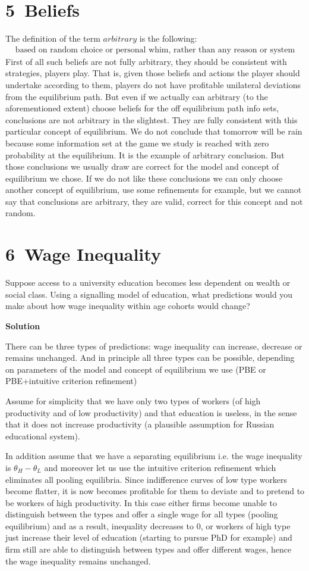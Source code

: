 \documentclass[a4paper]{article}
\begin{document}
\section*{5\ Beliefs}
The definition of the term $arbitrary$ is the following:
\begin{align*}
\text{based on random choice or personal whim, rather than any reason or system}
\end{align*}First of all such beliefs are not fully arbitrary, they should be consistent with strategies, players play. That is, given those beliefs and actions the player should undertake according to them, players do not have profitable unilateral deviations from the equilibrium path. But even if we actually can arbitrary (to the aforementioned extent) choose beliefs for the off equilibrium path info sets, conclusions are not arbitrary in the slightest. They are fully consistent with this particular concept of equilibrium. We do not conclude that tomorrow will be rain because some information set at the game we study is reached with zero probability at the equilibrium. It is the example of arbitrary conclusion. But those conclusions we usually draw are correct for the model and concept of equilibrium we chose. If we do not like these conclusions we can only choose another concept of equilibrium, use some refinements for example, but we cannot say that conclusions are arbitrary, they are valid, correct for this concept and not random.
\section*{6\ Wage Inequality}
Suppose access to a university education becomes less dependent on wealth or social class.
Using a signalling model of education, what predictions would you make about how wage
inequality within age cohorts would change?

\textbf{Solution}

There can be three types of predictions: wage inequality can increase, decrease or remains unchanged. And in principle all three types can be possible, depending on parameters of the model and concept of equilibrium we use (PBE or PBE+intuitive criterion refinement)


Assume for simplicity that we have only two types of workers (of high productivity and of low productivity) and that education is useless, in the sense that it does not increase productivity (a plausible assumption for Russian educational system).

In addition assume that we have a separating equilibrium i.e. the wage inequality is $\theta_H - \theta_L$ and moreover let us use the intuitive criterion refinement which eliminates all pooling equilibria. Since indifference curves of low type workers become flatter, it is now becomes profitable for them to deviate and to pretend to be workers of high productivity. In this case either firms become unable to distinguish between the types and offer a single wage for all types (pooling equilibrium) and as a result, inequality decreases to 0, or workers of high type just increase their level of education (starting to pursue PhD for example) and firm still are able to distinguish between types and offer different wages, hence the wage inequality remains unchanged.
\end{document}
